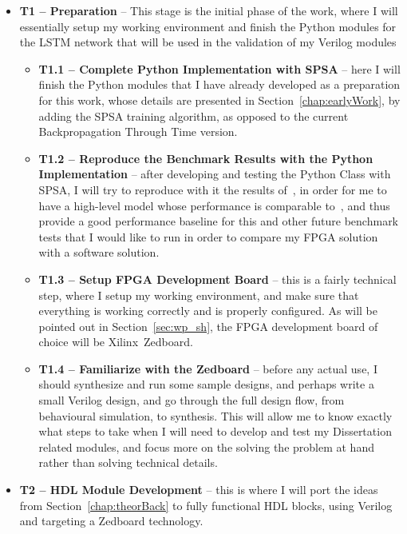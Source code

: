 \begin{itemize}
    \item \textbf{T1 -- Preparation} -- This stage is the initial phase of the work, where I will essentially setup my working environment and finish the Python modules for the LSTM network that will be used in the validation of my Verilog modules

        \begin{itemize}
            \item \textbf{T1.1 -- Complete Python Implementation with SPSA} -- here I will finish the Python modules that I have already developed as a preparation for this work, whose details are presented in Section~\ref{chap:earlyWork}, by adding the SPSA training algorithm, as opposed to the current Backpropagation Through Time version.

            \item \textbf{T1.2 -- Reproduce the Benchmark Results with the Python Implementation} -- after developing and testing the Python Class with SPSA, I will try to reproduce with it the results of~\cite{Tavear13}, in order for me to have a high-level model whose performance is comparable to~\cite{Tavear13, Hochreiter07}, and thus provide a good performance baseline for this and other future benchmark tests that I would like to run in order to compare my FPGA solution with a software solution.

            \item \textbf{T1.3 -- Setup FPGA Development Board} -- this is a fairly technical step, where I setup my working environment, and make sure that everything is working correctly and is properly configured. As will be pointed out in Section~\ref{sec:wp_sh}, the FPGA development board of choice will be Xilinx~\textregistered Zedboard.

            \item \textbf{T1.4 -- Familiarize with the Zedboard} -- before any actual use, I should synthesize and run some sample designs, and perhaps write a small Verilog design, and go through the full design flow, from behavioural simulation, to synthesis. This will allow me to know exactly what steps to take when I will need to develop and test my Dissertation related modules, and focus more on the solving the problem at hand rather than solving technical details.
        \end{itemize}

    \item \textbf{T2 -- HDL Module Development} -- this is where I will port the ideas from Section~\ref{chap:theorBack} to fully functional HDL blocks, using Verilog and targeting a Zedboard technology.


\end{itemize}
